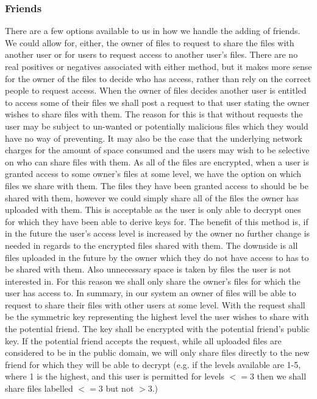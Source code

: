 \documentclass[12pt, titlepage]{article}
\begin{document}
\subsubsection{Friends}
There are a few options available to us in how we handle the adding of friends. We could allow for, either, the owner of files to request to share the files with another user or for users to request access to another user's files. There are no real positives or negatives associated with either method, but it makes more sense for the owner of the files to decide who has access, rather than rely on the correct people to request access.
\newline \indent When the owner of files decides another user is entitled to access some of their files we shall post a request to that user stating the owner wishes to share files with them. The reason for this is that without requests the user may be subject to un-wanted or potentially malicious files which they would have no way of preventing. It may also be the case that the underlying network charges for the amount of space consumed and the users may wish to be selective on who can share files with them.
\newline \indent As all of the files are encrypted, when a user is granted access to some owner's files at some level, we have the option on which files we share with them. The files they have been granted access to should be be shared with them, however we could simply share all of the files the owner has uploaded with them. This is acceptable as the user is only able to decrypt ones for which they have been able to derive keys for. The benefit of this method is, if in the future the user's access level is increased by the owner no further change is needed in regards to the encrypted files shared with them. The downside is all files uploaded in the future by the owner which they do not have access to has to be shared with them. Also unnecessary space is taken by files the user is not interested in. For this reason we shall only share the owner's files for which the user has access to.
\newline \indent In summary, in our system an owner of files will be able to request to share their files with other users at some level. With the request shall be the symmetric key representing the highest level the user wishes to share with the potential friend. The key shall be encrypted with the potential friend's public key. If the potential friend accepts the request, while all uploaded files are considered to be in the public domain, we will only share files directly to the new friend for which they will be able to decrypt (e.g. if the levels available are 1-5, where 1 is the highest, and this user is permitted for levels $<= 3$ then we shall share files labelled $<= 3$ but not $> 3$.)
\end{document}
